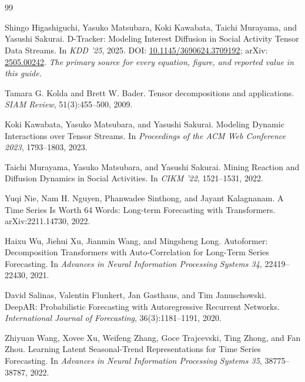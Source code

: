 \section*{\DTReferencesName}

\small
\begin{thebibliography}{99}

Shingo Higashiguchi, Yasuko Matsubara, Koki Kawabata, Taichi Murayama, and Yasushi Sakurai.
\newblock D-Tracker: Modeling Interest Diffusion in Social Activity Tensor Data Streams.
\newblock In \emph{KDD '25}, 2025.
\newblock DOI: \href{https://doi.org/10.1145/3690624.3709192}{10.1145/3690624.3709192};
arXiv: \href{https://arxiv.org/abs/2505.00242}{2505.00242}.
\newblock \emph{The primary source for every equation, figure, and reported value in this guide.}

Tamara G. Kolda and Brett W. Bader.
\newblock Tensor decompositions and applications.
\newblock \emph{SIAM Review}, 51(3):455--500, 2009.

Koki Kawabata, Yasuko Matsubara, and Yasushi Sakurai.
\newblock Modeling Dynamic Interactions over Tensor Streams.
\newblock In \emph{Proceedings of the ACM Web Conference 2023}, 1793--1803, 2023.

Taichi Murayama, Yasuko Matsubara, and Yasushi Sakurai.
\newblock Mining Reaction and Diffusion Dynamics in Social Activities.
\newblock In \emph{CIKM '22}, 1521--1531, 2022.

Yuqi Nie, Nam H. Nguyen, Phanwadee Sinthong, and Jayant Kalagnanam.
\newblock A Time Series Is Worth 64 Words: Long-term Forecasting with Transformers.
\newblock arXiv:2211.14730, 2022.

Haixu Wu, Jiehui Xu, Jianmin Wang, and Mingsheng Long.
\newblock Autoformer: Decomposition Transformers with Auto-Correlation for Long-Term Series Forecasting.
\newblock In \emph{Advances in Neural Information Processing Systems 34}, 22419--22430, 2021.

David Salinas, Valentin Flunkert, Jan Gasthaus, and Tim Januschowski.
\newblock DeepAR: Probabilistic Forecasting with Autoregressive Recurrent Networks.
\newblock \emph{International Journal of Forecasting}, 36(3):1181--1191, 2020.

Zhiyuan Wang, Xovee Xu, Weifeng Zhang, Goce Trajcevski, Ting Zhong, and Fan Zhou.
\newblock Learning Latent Seasonal-Trend Representations for Time Series Forecasting.
\newblock In \emph{Advances in Neural Information Processing Systems 35}, 38775--38787, 2022.


\end{thebibliography}
